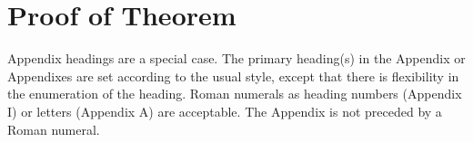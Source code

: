 \section{Proof of Theorem}

Appendix headings are a special case. The primary heading(s) in the Appendix or Appendixes are set according to the usual style, except that there is flexibility in the enumeration of the heading. Roman numerals as heading numbers (Appendix I) or letters (Appendix A) are acceptable. The Appendix is not preceded by a Roman numeral.
